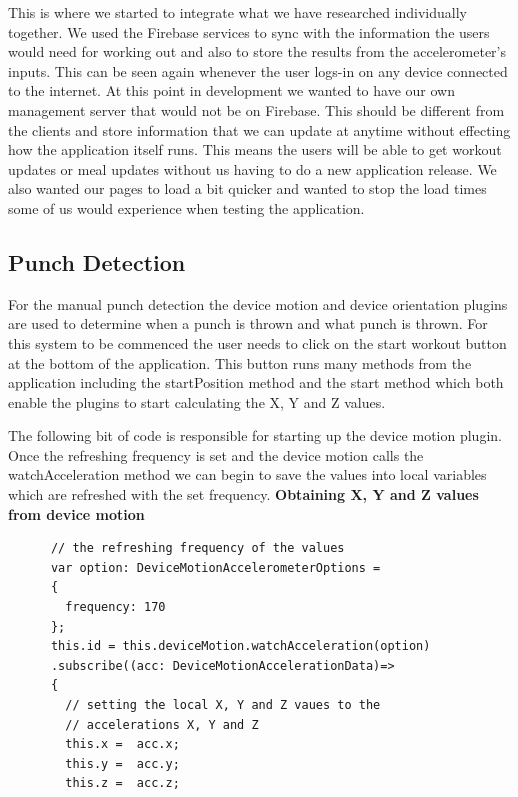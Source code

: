 \documentclass[a4paper,12pt]{report}
\begin{document}
This is where we started to integrate what we have researched individually together. We used the Firebase services to sync with the information the users would need for working out and also to store the results from the accelerometer's inputs. This can be seen again whenever the user logs-in on any device connected to the internet. At this point in development we wanted to have our own management server that would not be on Firebase. This should be different from the clients and store information that we can update at anytime without effecting how the application itself runs. This means the users will be able to get workout updates or meal updates without us having to do a new application release. We also wanted our pages to load a bit quicker and wanted to stop the load times some of us would experience when testing the application.
\newpage
\subsection{Punch Detection}
For the manual punch detection the device motion and device orientation plugins are used to determine when a punch is thrown and what punch is thrown. 
For this system to be commenced the user needs to click on the start workout button at the bottom of the application.
This button runs many methods from the application including the startPosition method and the start method which both enable the plugins to start calculating the X, Y and Z values.

The following bit of code is responsible for starting up the device motion plugin.
Once the refreshing frequency is set and the device motion calls the watchAcceleration method we can begin to save the values into local variables which are refreshed with the set frequency.
\textbf{Obtaining X, Y and Z values from device motion}
\begin{verbatim} 
      // the refreshing frequency of the values 
      var option: DeviceMotionAccelerometerOptions = 
      {
        frequency: 170
      };
      this.id = this.deviceMotion.watchAcceleration(option)
      .subscribe((acc: DeviceMotionAccelerationData)=>
      {
        // setting the local X, Y and Z vaues to the 
        // accelerations X, Y and Z 
        this.x =  acc.x;
        this.y =  acc.y;
        this.z =  acc.z;   
\end{verbatim}
\end{document}
